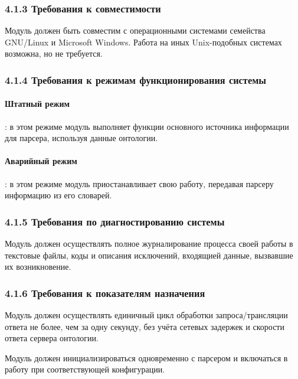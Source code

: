 \subsubsection*{4.1.3 Требования к совместимости}
Модуль должен быть совместим с операционными системами семейства GNU/Linux и Microsoft Windows. Работа на иных Unix-подобных системах возможна, но не требуется.

\subsubsection*{4.1.4 Требования к режимам функционирования системы}

\paragraph{Штатный режим}: в этом режиме модуль выполняет функции основного источника информации для парсера, используя данные онтологии.

\paragraph{Аварийный режим}: в этом режиме модуль приостанавливает свою работу, передавая парсеру информацию из его словарей.

\subsubsection*{4.1.5 Требования по диагностированию системы}
Модуль должен осуществлять полное журналирование процесса своей работы в текстовые файлы, коды и описания исключений, входящией данные, вызвавшие их возникновение.

\subsubsection*{4.1.6 Требования к показателям назначения}

Модуль должен осуществлять единичный цикл обработки запроса/трансляции ответа не более, чем за одну секунду, без учёта сетевых задержек и скорости ответа сервера онтологии.

Модуль должен инициализироваться одновременно с парсером и включаться в работу при соответствующей конфигурации.

